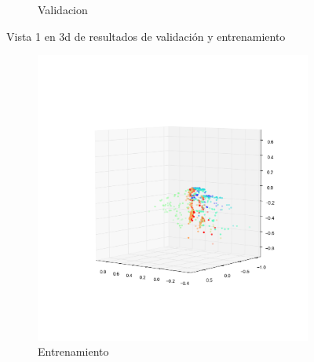 \begin{figure}[H]
\begin{subfigure}[b]{0.5\textwidth}
                \caption{Validacion}
                \label{fig: ej1_sanger_3d_1_valid}
        \end{subfigure}
        \caption{Vista 1 en 3d de resultados de validación y entrenamiento}
        \label{fig: ej1_sanger_3d_1}
\end{figure}

\begin{figure}[H]
        \begin{subfigure}[b]{0.5\textwidth}
                \includegraphics[width=\linewidth]{secciones/graficos/sanger/2_train.png}
                \caption{Entrenamiento}
                \label{fig: ej1_sanger_3d_2_train}
        \end{subfigure}
        \begin{subfigure}[b]{0.5\textwidth}

\end{subfigure}
\end{figure}
